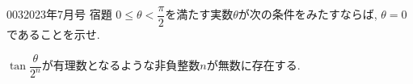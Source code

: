 \begin{prob}{003}{}{2023年7月号 宿題}
 $0 \leq \theta < \dfrac{\pi}{2}$を満たす実数$\theta$が次の条件をみたすならば, $\theta=0$であることを示せ.
 \begin{center}
 $\tan{\dfrac{\theta}{2^n}}$が有理数となるような非負整数$n$が無数に存在する.
 \end{center}
\end{prob}
